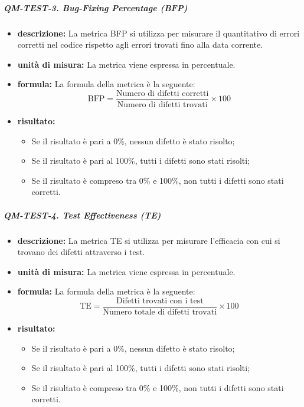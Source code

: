             \subparagraph{QM-TEST-3. Bug-Fixing Percentage (BFP)}
            \begin{itemize}
                \item \textbf{descrizione: }
                La metrica BFP si utilizza per misurare il quantitativo di errori corretti nel codice rispetto agli errori trovati fino alla data corrente.

                \item \textbf{unità di misura: }
                La metrica viene espressa in percentuale.

                \item \textbf{formula: }
                La formula della metrica è la seguente:
                \[
                    \text{BFP} = \frac{\text{Numero di difetti corretti}}{\text{Numero di difetti trovati}} \times 100
                \]

                \item \textbf{risultato: }
                \begin{itemize}
                    \item Se il risultato è pari a 0\%, nessun difetto è stato risolto;
                    \item Se il risultato è pari al 100\%, tutti i difetti sono stati risolti;
                    \item Se il risultato è compreso tra 0\% e 100\%, non tutti i difetti sono stati corretti.
                \end{itemize}
            \end{itemize}

            \subparagraph{QM-TEST-4. Test Effectiveness (TE)}
            \begin{itemize}
                \item \textbf{descrizione: }
                La metrica TE si utilizza per misurare l'efficacia con cui si trovano dei difetti attraverso i test.

                \item \textbf{unità di misura: }
                La metrica viene espressa in percentuale.

                \item \textbf{formula: }
                La formula della metrica è la seguente:
                \[
                    \text{TE} = \frac{\text{Difetti trovati con i test}}{\text{Numero totale di difetti trovati}} \times 100
                \]

                \item \textbf{risultato: }
                \begin{itemize}
                    \item Se il risultato è pari a 0\%, nessun difetto è stato risolto;
                    \item Se il risultato è pari al 100\%, tutti i difetti sono stati risolti;
                    \item Se il risultato è compreso tra 0\% e 100\%, non tutti i difetti sono stati corretti.
                \end{itemize}  
            \end{itemize}       

